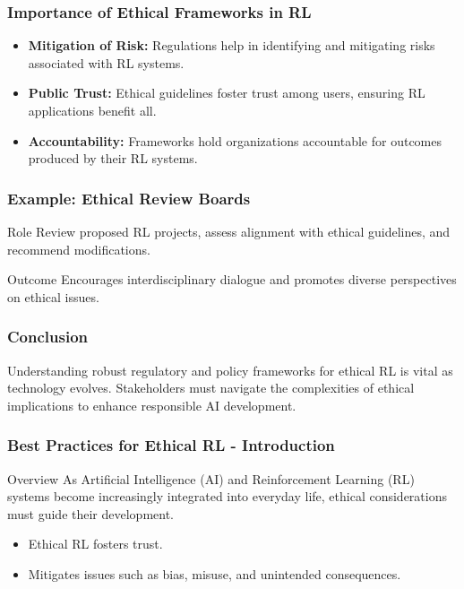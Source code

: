 \documentclass[aspectratio=169]{beamer}
\begin{document}
\begin{frame}[fragile]
    \frametitle{Importance of Ethical Frameworks in RL}
    \begin{itemize}
        \item \textbf{Mitigation of Risk:} Regulations help in identifying and mitigating risks associated with RL systems.
        \item \textbf{Public Trust:} Ethical guidelines foster trust among users, ensuring RL applications benefit all.
        \item \textbf{Accountability:} Frameworks hold organizations accountable for outcomes produced by their RL systems.
    \end{itemize}
\end{frame}

\begin{frame}[fragile]
    \frametitle{Example: Ethical Review Boards}
    \begin{block}{Role}
        Review proposed RL projects, assess alignment with ethical guidelines, and recommend modifications.
    \end{block}
    \begin{block}{Outcome}
        Encourages interdisciplinary dialogue and promotes diverse perspectives on ethical issues.
    \end{block}
\end{frame}

\begin{frame}[fragile]
    \frametitle{Conclusion}
    Understanding robust regulatory and policy frameworks for ethical RL is vital as technology evolves. Stakeholders must navigate the complexities of ethical implications to enhance responsible AI development.
\end{frame}

\begin{frame}[fragile]
    \frametitle{Best Practices for Ethical RL - Introduction}
    \begin{block}{Overview}
        As Artificial Intelligence (AI) and Reinforcement Learning (RL) systems become increasingly integrated into everyday life, ethical considerations must guide their development. 
        \begin{itemize}
            \item Ethical RL fosters trust.
            \item Mitigates issues such as bias, misuse, and unintended consequences.
        \end{itemize}
    \end{block}
\end{frame}
\end{document}
